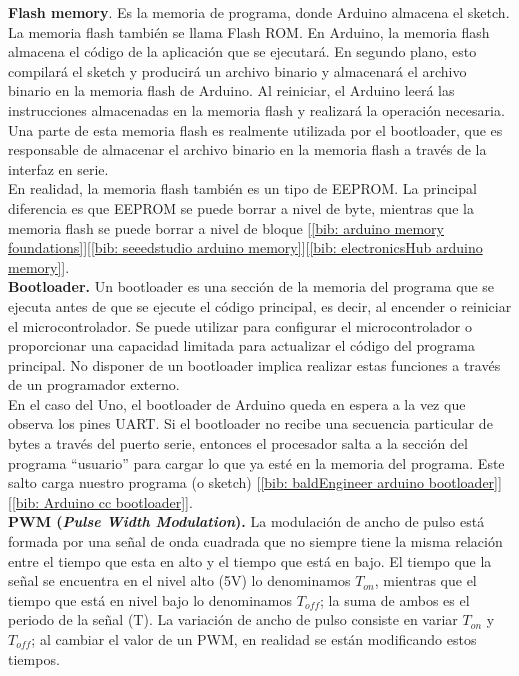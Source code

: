 \documentclass[12pt]{article}
\begin{document}
	\noindent \textbf{\large Flash memory}. Es la memoria de programa, donde Arduino almacena el sketch. La memoria flash también se llama Flash ROM. En Arduino, la memoria flash almacena el código de la aplicación que se ejecutará. En segundo plano, esto compilará el sketch y producirá un archivo binario y almacenará el archivo binario en la memoria flash de Arduino. Al reiniciar, el Arduino leerá las instrucciones almacenadas en la memoria flash y realizará la operación necesaria. Una parte de esta memoria flash es realmente utilizada por el bootloader, que es responsable de almacenar el archivo binario en la memoria flash a través de la interfaz en serie.\\
	\noindent En realidad, la memoria flash también es un tipo de EEPROM. La principal diferencia es que EEPROM se puede borrar a nivel de byte, mientras que la memoria flash se puede borrar a nivel de bloque [\ref{bib: arduino memory foundations}][\ref{bib: seeedstudio arduino memory}][\ref{bib: electronicsHub arduino memory}]. \\
	
	\noindent \textbf{\large Bootloader.} Un bootloader es una sección de la memoria del programa que se ejecuta antes de que se ejecute el código principal, es decir, al encender o reiniciar el microcontrolador. Se puede utilizar para configurar el microcontrolador o proporcionar una capacidad limitada para actualizar el código del programa principal. No disponer de un bootloader implica realizar estas funciones a través de un programador externo. \\
	\noindent En el caso del Uno, el bootloader de Arduino queda en espera a la vez que observa los pines UART. Si el bootloader no recibe una secuencia particular de bytes a través del puerto serie, entonces el procesador salta a la sección del programa ``usuario'' para cargar lo que ya esté en la memoria del programa. Este salto carga nuestro programa (o sketch) [\ref{bib: baldEngineer arduino bootloader}][\ref{bib: Arduino cc  bootloader}].\\
	
	\noindent \textbf{\large PWM (\textit{Pulse Width Modulation}).} La modulación de ancho de pulso está formada por una señal de onda cuadrada que no siempre tiene la misma relación entre el tiempo que esta en alto y el tiempo que está en bajo. El tiempo que la señal se encuentra en el nivel alto (5V) lo denominamos $T_{on}$, mientras que el tiempo que está en nivel bajo lo denominamos $T_{off}$; la suma de ambos es el periodo de la señal (T). La variación de ancho de pulso consiste en variar $T_{on}$ y $T_{off}$; al cambiar el valor de un PWM, en realidad se están modificando estos tiempos.
	
\end{document}

